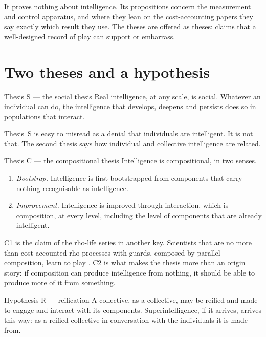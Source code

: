 \documentclass[11pt,a4paper]{article}
\begin{document}
It proves nothing about intelligence. Its propositions concern the measurement and control
apparatus, and where they lean on the cost-accounting papers they say exactly which result they
use. The theses are offered as theses: claims that a well-designed record of play can support or
embarrass.

\section{Two theses and a hypothesis}\label{sec:theses}

\begin{claimbox}{Thesis S --- the social thesis}
Real intelligence, at any scale, is social. Whatever an individual can do, the intelligence that
develops, deepens and persists does so in populations that interact.
\end{claimbox}

Thesis~S is easy to misread as a denial that individuals are intelligent. It is not that. The
second thesis says how individual and collective intelligence are related.

\begin{claimbox}{Thesis C --- the compositional thesis}
Intelligence is compositional, in two senses.
\begin{enumerate}[label=(C\arabic*),leftmargin=2.2em,itemsep=2pt]
\item \emph{Bootstrap.} Intelligence is first bootstrapped from components that carry nothing
  recognisable as intelligence.
\item \emph{Improvement.} Intelligence is improved through interaction, which is composition, at
  every level, including the level of components that are already intelligent.
\end{enumerate}
\end{claimbox}

C1 is the claim of the rho-life series in another key. Scientists that are no more than
cost-accounted rho processes with guards, composed by parallel composition, learn to play
\cite{rholife-scientist,rholife-game}. C2 is what makes the thesis more than an origin story: if
composition can produce intelligence from nothing, it should be able to produce more of it from
something.

\begin{claimbox}{Hypothesis R --- reification}
A collective, as a collective, may be reified and made to engage and interact with its
components. Superintelligence, if it arrives, arrives this way: as a reified collective in
conversation with the individuals it is made from.
\end{claimbox}
\end{document}
